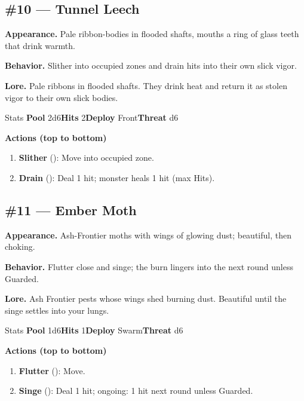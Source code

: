 \subsection*{\#10 --- Tunnel Leech}

\textbf{Appearance.} Pale ribbon-bodies in flooded shafts, mouths a ring of glass teeth that drink warmth.

\textbf{Behavior.} Slither into occupied zones and drain hits into their own slick vigor.

\textbf{Lore.} Pale ribbons in flooded shafts. They drink heat and return it as stolen vigor to their own slick bodies.

\begin{monsterentry}{Stats}
\textbf{Pool} 2d6\quad\textbf{Hits} 2\quad\textbf{Deploy} Front\quad\textbf{Threat} d6

\textbf{Actions (top to bottom)}
\begin{enumerate}\setlength{\itemsep}{0.15em}\setlength{\parskip}{0pt}
  \item \textbf{Slither} (\easy): Move into occupied zone.
  \item \textbf{Drain} (\medium): Deal 1 hit; monster heals 1 hit (max Hits).
\end{enumerate}
\end{monsterentry}

\subsection*{\#11 --- Ember Moth}

\textbf{Appearance.} Ash-Frontier moths with wings of glowing dust; beautiful, then choking.

\textbf{Behavior.} Flutter close and singe; the burn lingers into the next round unless Guarded.

\textbf{Lore.} Ash Frontier pests whose wings shed burning dust. Beautiful until the singe settles into your lungs.

\begin{monsterentry}{Stats}
\textbf{Pool} 1d6\quad\textbf{Hits} 1\quad\textbf{Deploy} Swarm\quad\textbf{Threat} d6

\textbf{Actions (top to bottom)}
\begin{enumerate}\setlength{\itemsep}{0.15em}\setlength{\parskip}{0pt}
  \item \textbf{Flutter} (\easy): Move.
  \item \textbf{Singe} (\medium): Deal 1 hit; ongoing: 1 hit next round unless Guarded.
\end{enumerate}
\end{monsterentry}

